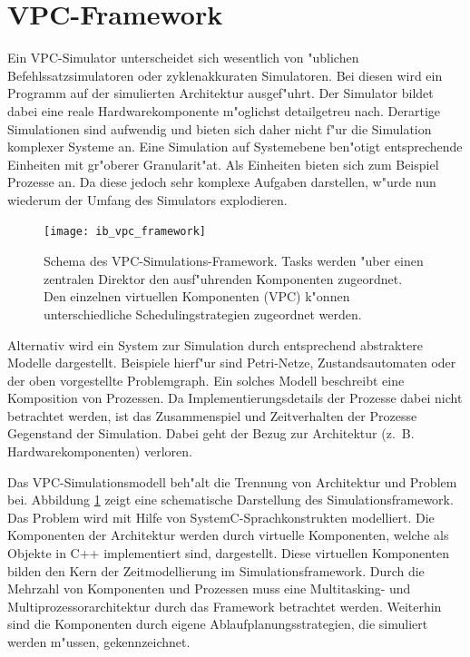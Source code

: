 \section{VPC-Framework}


Ein VPC-Simulator unterscheidet sich wesentlich von "ublichen
Befehlssatzsimulatoren oder zyklenakkuraten Simulatoren. Bei diesen wird ein
Programm auf der simulierten Architektur ausgef"uhrt. Der Simulator bildet
dabei eine reale Hardwarekomponente m"oglichst detailgetreu nach. Derartige
Simulationen sind aufwendig und bieten sich daher nicht f"ur die Simulation komplexer
Systeme an. Eine Simulation auf System\-ebene ben"otigt entsprechende Einheiten
mit gr"oberer Granularit"at. Als Einheiten bieten sich zum Beispiel Prozesse
an. Da diese jedoch sehr komplexe Aufgaben darstellen, w"urde nun wiederum der
Umfang des Simulators explodieren.

\begin{figure}
\begin{center}
\texttt{[image: ib\_vpc\_framework]}
\caption{Schema des VPC-Simulations-Framework. Tasks werden "uber einen
  zentralen Direktor den ausf"uhrenden Komponenten zugeordnet. Den einzelnen
  virtuellen Komponenten (VPC) k"onnen unterschiedliche Schedulingstrategien
  zugeordnet werden.}
\label{fig:vpc-framework-ueberblick}
\end{center}
\end{figure}

Alternativ wird ein System zur Simulation durch entsprechend abstraktere Modelle
dargestellt. Beispiele hierf"ur sind Petri-Netze\cite{baumgarten:1990}, Zustandsautomaten oder der
oben vorgestellte Problemgraph. Ein solches Modell beschreibt eine Komposition
von Prozessen. Da Implementierungsdetails der Prozesse dabei nicht
betrachtet werden, ist das Zusammenspiel und Zeitverhalten der Prozesse Gegenstand der
Simulation. Dabei geht der Bezug zur Architektur (z.~B. Hardwarekomponenten) %
 verloren. 


Das VPC-Simulationsmodell beh"alt die Trennung von Architektur und Problem
bei. Abbildung \ref{fig:vpc-framework-ueberblick} zeigt eine schematische
Darstellung des Simulationsframework. Das Problem wird mit Hilfe von
SystemC-Sprachkonstrukten modelliert. Die Komponenten der Architektur werden
durch virtuelle Komponenten, welche als Objekte in C++ implementiert sind,
dargestellt. Diese virtuellen Komponenten bilden den Kern der Zeitmodellierung im
Simulationsframework. Durch die Mehrzahl von Komponenten
und Prozessen muss eine  Multitasking- und Multiprozessorarchitektur durch das
Framework betrachtet werden. Weiterhin sind die Komponenten durch eigene
Ablaufplanungsstrategien, die simuliert werden m"ussen, gekennzeichnet.

